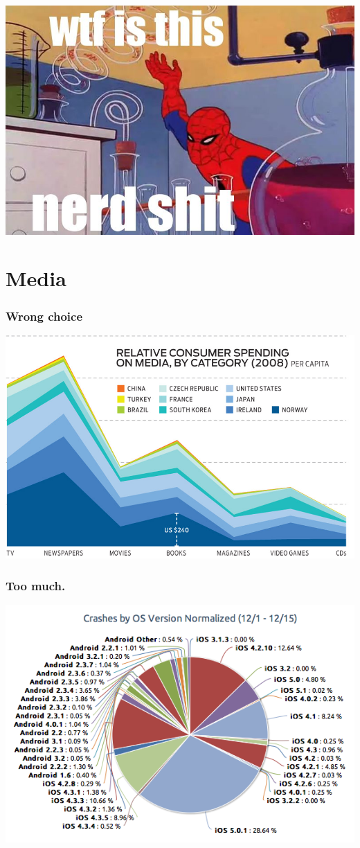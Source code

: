 \documentclass{beamer}
\begin{document}
\begin{frame}
  \includegraphics[width = \textwidth, keepaspectratio = true]{figure/nerd_shit}
\end{frame}

\section{Media}
\begin{frame}
  \frametitle{Wrong choice}
  \includegraphics[width = \textwidth, keepaspectratio = true]{figure/not_lines}
\end{frame}

\begin{frame}
  \frametitle{Too much.}
  \includegraphics[width = \textwidth, keepaspectratio = true]{figure/android}
\end{frame}
\end{document}
